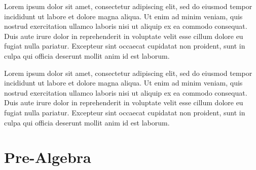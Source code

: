 \documentclass{article}
\begin{document}

\noindent
{}
\break

\noindent Lorem ipsum dolor sit amet, consectetur adipiscing elit, sed do eiusmod tempor incididunt ut labore et dolore magna aliqua. Ut enim ad minim veniam, quis nostrud exercitation ullamco laboris nisi ut aliquip ex ea commodo consequat. Duis aute irure dolor in reprehenderit in voluptate velit esse cillum dolore eu fugiat nulla pariatur. Excepteur sint occaecat cupidatat non proident, sunt in culpa qui officia deserunt mollit anim id est laborum.
\break
\break


\noindent
{}
\break

\noindent Lorem ipsum dolor sit amet, consectetur adipiscing elit, sed do eiusmod tempor incididunt ut labore et dolore magna aliqua. Ut enim ad minim veniam, quis nostrud exercitation ullamco laboris nisi ut aliquip ex ea commodo consequat. Duis aute irure dolor in reprehenderit in voluptate velit esse cillum dolore eu fugiat nulla pariatur. Excepteur sint occaecat cupidatat non proident, sunt in culpa qui officia deserunt mollit anim id est laborum.
\break
\break


\pagebreak

\section{Pre-Algebra}
\end{document}
